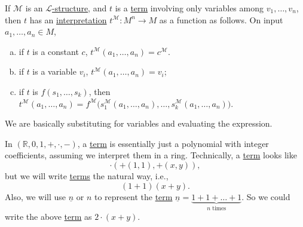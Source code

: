 If \(\mathcal{M}\) is an \hyperref[def:structure]{\(\mathcal{L} \)-structure}, and \(t\) is a \hyperref[def:term]{term} involving only variables among \(v_1, \ldots , v_n\), then \(t\) has an \hyperref[not:interpretation]{interpretation} \(t^{\mathcal{M}} \colon M^n \to M\) as a function as follows. On input \(a_1, \ldots , a_n \in M\),
\begin{enumerate}[(a)]
	\item if \(t\) is a constant \(c\), \(t^{\mathcal{M} } (a_1, \ldots , a_n) = c^{\mathcal{M} }\).
	\item if \(t\) is a variable \(v_i\), \(t^{\mathcal{M} } (a_1, \ldots , a_n) = v_i\);
	\item if \(t\) is \(f(s_1, \ldots , s_k)\), then \(t^{\mathcal{M} } (a_1, \ldots , a_n) = f^{\mathcal{M} } \big(s_1^{\mathcal{M} }(a_1, \ldots , a_n), \ldots , s_k^{\mathcal{M}}(a_1, \ldots , a_n) \big)\).
\end{enumerate}

\begin{intuition}
	We are basically substituting for variables and evaluating the expression.
\end{intuition}

\begin{eg}
	In \((\mathbb{R} , 0, 1, +, \cdot, -)\), a \hyperref[def:term]{term} is essentially just a polynomial with integer coefficients, assuming we interpret them in a ring. Technically, a \hyperref[def:term]{term} looks like
	\[
		\cdot(+(1, 1), +(x, y)),
	\]
	but we will write \hyperref[def:term]{terms} the natural way, i.e.,
	\[
		(1+1) (x+y).
	\]
	Also, we will use \(\underline{n}\) or \(n\) to represent the \hyperref[def:term]{term} \(\underline{n} = \underbrace{1+1+\ldots +1}_{n\text{ times}}\). So we could write the above \hyperref[def:term]{term} as \(2\cdot(x+y)\).
\end{eg}

